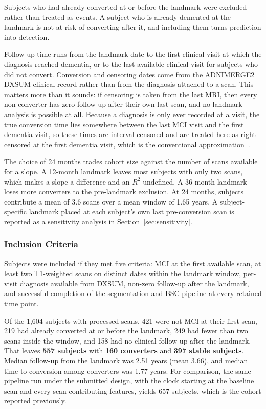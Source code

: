 \documentclass[blue]{ludusofficial}  %
\begin{document}
Subjects who had already converted at or before the landmark were excluded rather than treated as events. A subject who is already demented at the landmark is not at risk of converting after it, and including them turns prediction into detection.

Follow-up time runs from the landmark date to the first clinical visit at which the diagnosis reached dementia, or to the last available clinical visit for subjects who did not convert. Conversion and censoring dates come from the ADNIMERGE2 DXSUM clinical record rather than from the diagnosis attached to a scan. This matters more than it sounds: if censoring is taken from the last MRI, then every non-converter has zero follow-up after their own last scan, and no landmark analysis is possible at all. Because a diagnosis is only ever recorded at a visit, the true conversion time lies somewhere between the last MCI visit and the first dementia visit, so these times are interval-censored and are treated here as right-censored at the first dementia visit, which is the conventional approximation~\cite{zhang2024interval}.

The choice of 24 months trades cohort size against the number of scans available for a slope. A 12-month landmark leaves most subjects with only two scans, which makes a slope a difference and an $R^2$ undefined. A 36-month landmark loses more converters to the pre-landmark exclusion. At 24 months, subjects contribute a mean of 3.6 scans over a mean window of 1.65 years. A subject-specific landmark placed at each subject's own last pre-conversion scan is reported as a sensitivity analysis in Section~\ref{sec:sensitivity}.

\subsubsection{Inclusion Criteria}

Subjects were included if they met five criteria: MCI at the first available scan, at least two T1-weighted scans on distinct dates within the landmark window, per-visit diagnosis available from DXSUM, non-zero follow-up after the landmark, and successful completion of the segmentation and BSC pipeline at every retained time point.

Of the 1,604 subjects with processed scans, 421 were not MCI at their first scan, 219 had already converted at or before the landmark, 249 had fewer than two scans inside the window, and 158 had no clinical follow-up after the landmark. That leaves \textbf{557 subjects} with \textbf{160 converters} and \textbf{397 stable subjects}. Median follow-up from the landmark was 2.51 years (mean 3.66), and median time to conversion among converters was 1.77 years. For comparison, the same pipeline run under the submitted design, with the clock starting at the baseline scan and every scan contributing features, yields 657 subjects, which is the cohort reported previously.
\end{document}
